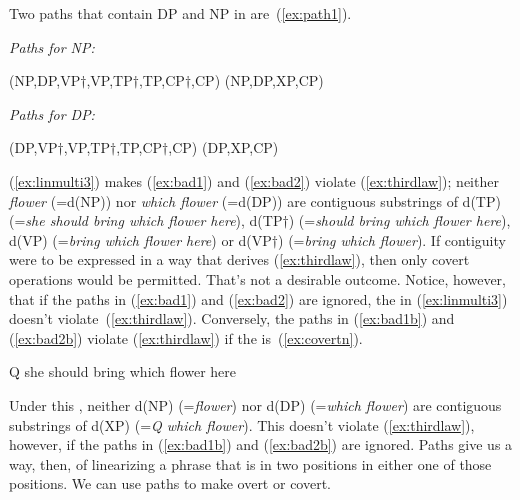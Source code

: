 \documentclass[output=paper]{langsci/langscibook}
\begin{document}
Two paths that contain DP and NP in  are~(\ref{ex:path1}).

\begin{exe}
	\ex \label{ex:path1}
	\begin{xlist}
		\ex \emph{Paths for NP:}
		\begin{xlist}
		\ex \label{ex:bad1} (NP,DP,VP$\dag$,VP,TP$\dag$,TP,CP$\dag$,CP)
		\ex \label{ex:bad1b}(NP,DP,XP,CP)
		\end{xlist}
		\ex \emph{Paths for DP:}
		\begin{xlist}
			\ex \label{ex:bad2} (DP,VP$\dag$,VP,TP$\dag$,TP,CP$\dag$,CP)
			\ex \label{ex:bad2b}(DP,XP,CP)
		\end{xlist}
	\end{xlist}
\end{exe}

(\ref{ex:linmulti3}) makes (\ref{ex:bad1}) and (\ref{ex:bad2}) violate (\ref{ex:thirdlaw}); neither \emph{flower} (=d(NP)) nor \emph{which flower} (=d(DP)) are contiguous substrings of d(TP) (=\emph{she should bring which flower here}), d(TP$\dag$) (=\emph{should bring which flower here}), d(VP) (=\emph{bring which flower here}) or d(VP$\dag$) (=\emph{bring which flower}). If contiguity were to be expressed in a way that derives (\ref{ex:thirdlaw}), then only covert  operations would be permitted. That's not a desirable outcome. Notice, however, that if the paths in (\ref{ex:bad1}) and (\ref{ex:bad2}) are ignored, the  in (\ref{ex:linmulti3}) doesn't violate~(\ref{ex:thirdlaw}). Conversely, the paths in (\ref{ex:bad1b}) and (\ref{ex:bad2b}) violate (\ref{ex:thirdlaw}) if the  is~(\ref{ex:covertn}).
\begin{exe}
	\ex \label{ex:covertn} Q she should bring which flower here
\end{exe}

Under this , neither d(NP) (=\emph{flower}) nor d(DP) (=\emph{which flower}) are contiguous substrings of d(XP) (=\emph{Q which flower}). This  doesn't violate (\ref{ex:thirdlaw}), however, if the paths in (\ref{ex:bad1b}) and (\ref{ex:bad2b}) are ignored. Paths give us a way, then, of linearizing a phrase that is in two positions in either one of those positions. We can use paths to make  overt or covert.
\end{document}
